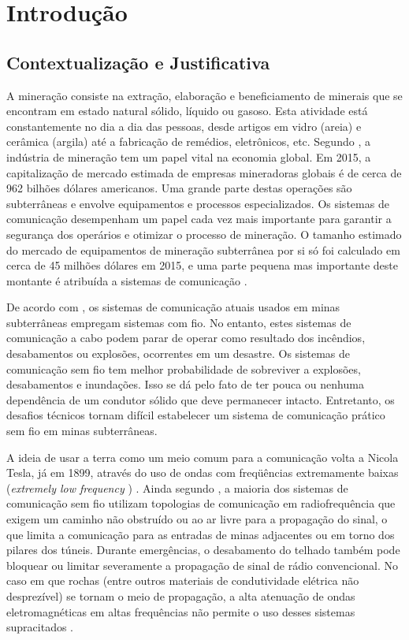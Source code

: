 \chapter[Introdução]{Introdução}

\section{Contextualização e Justificativa}


A mineração consiste na extração, elaboração e beneficiamento de minerais que se encontram em
estado natural sólido, líquido ou gasoso.  Esta atividade está constantemente no dia a dia das pessoas, desde artigos em vidro (areia) e cerâmica (argila) até a fabricação de remédios, eletrônicos, etc. Segundo \cite{forooshani2013survey}, a indústria de mineração tem um papel vital na economia global. Em 2015, a capitalização de mercado estimada de empresas mineradoras globais é de cerca de 962 bilhões dólares americanos. Uma grande parte destas operações são subterrâneas e envolve equipamentos e processos especializados. Os sistemas de comunicação desempenham um papel cada vez mais importante para garantir a segurança dos operários e otimizar o processo de mineração. O tamanho estimado do mercado de equipamentos de mineração subterrânea por si só foi calculado em cerca de 45 milhões dólares em 2015, e uma parte pequena mas importante deste montante é atribuída a sistemas de comunicação \cite{mining2012}.

De acordo com \cite{barkand2006through}, os sistemas de comunicação atuais usados em minas subterrâneas empregam sistemas com fio. No entanto, estes sistemas de comunicação a cabo podem parar de operar como resultado dos incêndios, desabamentos ou explosões, ocorrentes em um desastre. Os sistemas de comunicação sem fio tem melhor probabilidade de sobreviver a explosões, desabamentos e inundações. Isso se dá pelo fato de ter pouca ou nenhuma dependência de um condutor sólido que deve permanecer intacto. Entretanto, os desafios técnicos tornam difícil estabelecer um sistema de comunicação prático sem fio em minas subterrâneas. 

A ideia de usar a terra como um meio comum para a comunicação volta a Nicola Tesla, já em 1899, através do uso de ondas com freqüências extremamente baixas (\textit{extremely low frequency })  \cite{wheeler1961radio}. Ainda segundo \cite{barkand2006through}, a maioria dos sistemas de comunicação sem fio utilizam topologias de comunicação em radiofrequência que exigem um caminho não obstruído ou ao ar livre para a propagação do sinal, o que limita a comunicação para as entradas de minas adjacentes ou em torno dos pilares dos túneis. Durante emergências, o desabamento do telhado também pode bloquear ou limitar severamente a propagação de sinal de rádio convencional. No caso em que rochas (entre outros materiais de condutividade elétrica não desprezível) se tornam o meio de propagação, a alta atenuação de ondas eletromagnéticas em altas frequências não permite o uso desses sistemas supracitados \cite{raab1995signal}. 


